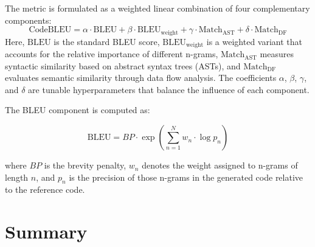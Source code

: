 The metric is formulated as a weighted linear combination of four complementary components:
\begin{equation}
    \text{CodeBLEU} = \alpha \cdot \text{BLEU} + \beta \cdot \text{BLEU}_{\text{weight}} + \gamma \cdot \text{Match}_{\text{AST}} + \delta \cdot \text{Match}_{\text{DF}}
\end{equation}
Here, \(\text{BLEU}\) is the standard BLEU score, \(\text{BLEU}_{\text{weight}}\) is a weighted variant that accounts for the relative importance of different n-grams, \(\text{Match}_{\text{AST}}\) measures syntactic similarity based on abstract syntax trees (ASTs), and \(\text{Match}_{\text{DF}}\) evaluates semantic similarity through data flow analysis. The coefficients \(\alpha\), \(\beta\), \(\gamma\), and \(\delta\) are tunable hyperparameters that balance the influence of each component.

The BLEU component is computed as:

\begin{equation}
    \text{BLEU} = BP \cdot \exp\left(\sum_{n=1}^{N} w_n \cdot \log p_n\right)
\end{equation}

where \(BP\) is the brevity penalty, \(w_n\) denotes the weight assigned to n-grams of length \(n\), and \(p_n\) is the precision of those n-grams in the generated code relative to the reference code.












\section{Summary}